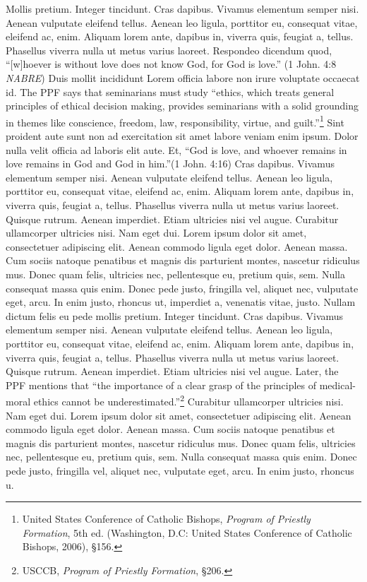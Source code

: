 \documentclass[
    12pt,
    letterpaper,
    oneside,
    noraggedright
]{turabian-researchpaper}
\begin{document}
Mollis pretium. Integer tincidunt. Cras dapibus. Vivamus elementum
semper nisi. Aenean vulputate eleifend tellus. Aenean leo ligula,
porttitor eu, consequat vitae, eleifend ac, enim. Aliquam lorem ante,
dapibus in, viverra quis, feugiat a, tellus. Phasellus viverra nulla ut
metus varius laoreet. Respondeo dicendum quod, ``{[}w{]}hoever is
without love does not know God, for God is love.'' {(1 John. 4:8{
\emph{NABRE}})} Duis mollit incididunt Lorem officia labore non irure
voluptate occaecat id. The PPF says that seminarians must study
``ethics, which treats general principles of ethical decision making,
provides seminarians with a solid grounding in themes like conscience,
freedom, law, responsibility, virtue, and guilt.''\footnote{United
  States Conference of Catholic Bishops, \emph{Program of Priestly
  Formation}, 5th ed. (Washington, D.C: United States Conference of
  Catholic Bishops, 2006), §156.} Sint proident aute sunt non ad
exercitation sit amet labore veniam enim ipsum. Dolor nulla velit
officia ad laboris elit aute. Et, ``God is love, and whoever remains in
love remains in God and God in him.''{(1 John. 4:16)} Cras dapibus.
Vivamus elementum semper nisi. Aenean vulputate eleifend tellus. Aenean
leo ligula, porttitor eu, consequat vitae, eleifend ac, enim. Aliquam
lorem ante, dapibus in, viverra quis, feugiat a, tellus. Phasellus
viverra nulla ut metus varius laoreet. Quisque rutrum. Aenean imperdiet.
Etiam ultricies nisi vel augue. Curabitur ullamcorper ultricies nisi.
Nam eget dui. Lorem ipsum dolor sit amet, consectetuer adipiscing elit.
Aenean commodo ligula eget dolor. Aenean massa. Cum sociis natoque
penatibus et magnis dis parturient montes, nascetur ridiculus mus. Donec
quam felis, ultricies nec, pellentesque eu, pretium quis, sem. Nulla
consequat massa quis enim. Donec pede justo, fringilla vel, aliquet nec,
vulputate eget, arcu. In enim justo, rhoncus ut, imperdiet a, venenatis
vitae, justo. Nullam dictum felis eu pede mollis pretium. Integer
tincidunt. Cras dapibus. Vivamus elementum semper nisi. Aenean vulputate
eleifend tellus. Aenean leo ligula, porttitor eu, consequat vitae,
eleifend ac, enim. Aliquam lorem ante, dapibus in, viverra quis, feugiat
a, tellus. Phasellus viverra nulla ut metus varius laoreet. Quisque
rutrum. Aenean imperdiet. Etiam ultricies nisi vel augue. Later, the PPF
mentions that ``the importance of a clear grasp of the principles of
medical-moral ethics cannot be underestimated.''\footnote{USCCB, \emph{Program
  of Priestly Formation}, §206.} Curabitur ullamcorper ultricies nisi.
Nam eget dui. Lorem ipsum dolor sit amet, consectetuer adipiscing elit.
Aenean commodo ligula eget dolor. Aenean massa. Cum sociis natoque
penatibus et magnis dis parturient montes, nascetur ridiculus mus. Donec
quam felis, ultricies nec, pellentesque eu, pretium quis, sem. Nulla
consequat massa quis enim. Donec pede justo, fringilla vel, aliquet nec,
vulputate eget, arcu. In enim justo, rhoncus u.
\end{document}
